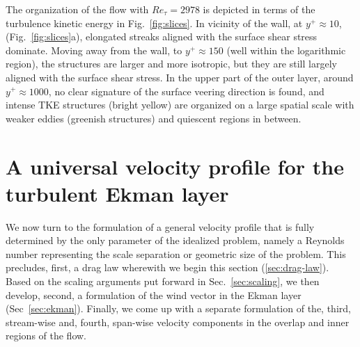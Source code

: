 \documentclass[smallcondensed,final]{svjour3}
\begin{document}
The organization of the flow with $Re_\tau=2978$ is depicted in terms of the turbulence kinetic energy in Fig.~\ref{fig:slices}.
%
In vicinity of the wall, at $y^+\approx 10$, (Fig.~\ref{fig:slices}a), elongated streaks aligned with the
surface shear stress dominate.
%
Moving away from the wall, to $y^+\approx 150$ (well within the logarithmic region), the structures
are larger and more isotropic, but they are still largely aligned with the surface shear stress.
%
In the upper part of the outer layer, around $y^+\approx 1000$, no clear signature of the
surface veering direction is found, and intense TKE structures (bright yellow)
are organized on a large spatial scale with weaker eddies (greenish structures) and quiescent regions
in between.  

\section{A universal velocity profile for the turbulent Ekman layer}
\label{sec:profiles} 
%
We now turn to the formulation of a general velocity profile that is fully determined by the only
parameter of the idealized problem, namely a Reynolds number representing the scale separation or
geometric size of the problem.
%
This precludes, first, a drag law wherewith we begin this section (\ref{sec:drag-law}).
Based on the scaling arguments put forward in Sec.~\ref{sec:scaling}, we then develop, second,
a formulation of the wind vector in the Ekman layer (Sec~\ref{sec:ekman}). Finally, we come up
with a separate formulation of the, third, stream-wise and, fourth, span-wise velocity components in the
overlap and inner regions of the flow. 
%
% 
\end{document}
